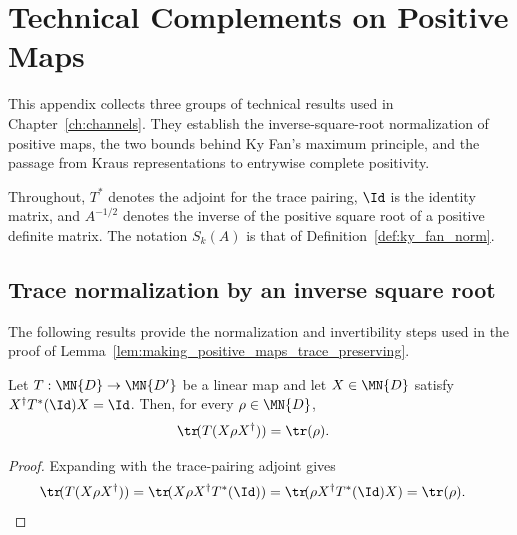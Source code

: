 \chapter{Technical Complements on Positive Maps}
\label{ch:positive_maps_technical_complements}

This appendix collects three groups of technical results used in
Chapter~\ref{ch:channels}.  They establish the inverse-square-root
normalization of positive maps, the two bounds behind Ky Fan's maximum
principle, and the passage from Kraus representations to entrywise complete
positivity.

Throughout, $T^*$ denotes the adjoint for the trace pairing, $\Id$ is the
identity matrix, and $A^{-1/2}$ denotes the inverse of the positive square
root of a positive definite matrix.  The notation $S_k(A)$ is that of
Definition~\ref{def:ky_fan_norm}.

\section{Trace normalization by an inverse square root}

The following results provide the normalization and invertibility steps used
in the proof of Lemma~\ref{lem:making_positive_maps_trace_preserving}.

\begin{lemma}
    \label{lem:trace_normalization_criterion_trace}
    \leanok
    Let $T:\MN{D}\to\MN{D'}$ be a linear map and let $X\in\MN{D}$ satisfy
    $X^\dagger T^*(\Id)X=\Id$. Then, for every $\rho\in\MN{D}$,
    \begin{align}
        \tr\!(T(X\rho X^\dagger))
         & =\tr(\rho).
        \notag
    \end{align}
\end{lemma}

\begin{proof}\leanok
    Expanding with the trace-pairing adjoint gives
    \begin{align}
        \tr\!(T(X\rho X^\dagger))
         & =\tr\!(X\rho X^\dagger T^*(\Id))
        =\tr\!(\rho X^\dagger T^*(\Id)X)
        =\tr(\rho).
        \notag
    \end{align}
\end{proof}

